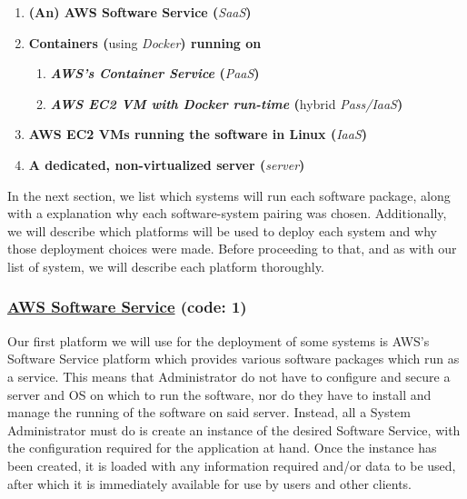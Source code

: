 \begin{spacing}{1.40}
\begin{enumerate}[label=\Large{\textbf{\arabic*}):}]
	\item \textbf{(An) AWS Software Service (}\emph{SaaS}\textbf{)}
	\item \textbf{Containers (}using \emph{Docker}\textbf{) running on}

	\begin{enumerate}[label=\Large{\textbf{\roman*}):}]
		\item \textbf{\emph{AWS's Container Service} (}\emph{PaaS}\textbf{)}
		\item \textbf{\emph{AWS EC2 VM with Docker run-time} (}hybrid \emph{Pass/IaaS}\textbf{)}
	\end{enumerate}
	\vspace{0.025in}
	
	\item \textbf{AWS EC2 VMs running the software in Linux (}\emph{IaaS}\textbf{)}
	\item \textbf{A dedicated, non-virtualized server (}\emph{server}\textbf{)}
\end{enumerate}
\end{spacing}


In the next section, we list which systems will run each software package, along with a explanation why each software-system pairing was chosen.  Additionally, we will describe which platforms will be used to deploy each system and why those deployment choices were made.  Before proceeding to that, and as with our list of system, we will describe each platform thoroughly.


\subsubsection{\underline{AWS Software Service} (code: \textbf{1})}

Our first platform we will use for the deployment of some systems is AWS's Software Service platform which provides various software packages which run as a service.  This means that Administrator do not have to configure and secure a server and OS on which to run the software, nor do they have to install and manage the running of the software on said server.  Instead, all a System Administrator must do is create an instance of the desired Software Service, with the configuration required for the application at hand.  Once the instance has been created, it is loaded with any information required and/or data to be used, after which it is immediately available for use by users and other clients. 


